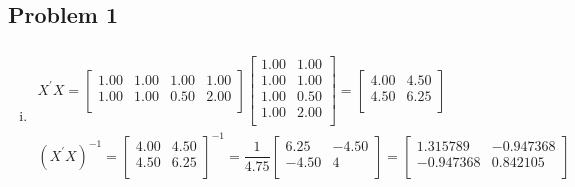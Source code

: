 \documentclass{article}
\begin{document}
\begin{flushleft}

	\section*{Problem 1}
\begin{enumerate}[(i)]
\item 
\begin{multline*}\\
X^{'}X=\left[
\begin{array}{rrrr}
1.00 & 1.00 & 1.00 & 1.00 \\ 
1.00 & 1.00 & 0.50 & 2.00 \\ 
\end{array}
\right]
\left[
\begin{array}{rr}
1.00 & 1.00 \\ 
1.00 & 1.00 \\ 
1.00 & 0.50 \\ 
1.00 & 2.00 \\ 
\end{array}
\right]=\left[
\begin{array}{rr}
4.00 & 4.50 \\ 
4.50 & 6.25 \\ 
\end{array}
\right]\\
(X^{'}X)^{-1}=\left[
\begin{array}{rr}
4.00 & 4.50 \\ 
4.50 & 6.25 \\ 
\end{array}
\right]^{-1}=\dfrac{1}{4.75}\left[\begin{array}{rr}
6.25 & -4.50 \\ 
-4.50 & 4 \\ 
\end{array}\right]=\left[
\begin{array}{rr}
1.315789 & -0.947368 \\ 
-0.947368 & 0.842105 \\ 
\end{array}
\right]\\
\end{multline*}


\end{enumerate}
\end{flushleft}
\end{document}
